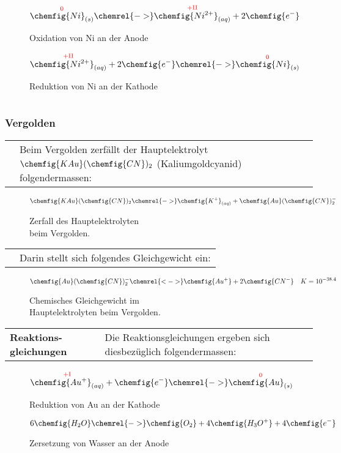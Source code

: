 \begin{figure}[H]\centering
	$$\overset{\mathrm{\color{red}{0}}}{\chemfig{Ni}_{(s)}} \chemrel{->} \overset{\mathrm{\color{red}{+II}}}{\chemfig{Ni^{2+}}_{(aq)}} + 2\chemfig{e^{-}}$$
	\caption{Oxidation von Ni an der Anode}
	$$\overset{\mathrm{\color{red}{+II}}}{\chemfig{Ni^{2+}}_{(aq)}} + 2\chemfig{e^{-}} \chemrel{->} \overset{\mathrm{\color{red}{0}}}{\chemfig{Ni}_{(s)}}$$
	\caption{Reduktion von Ni an der Kathode}
\end{figure}

\begin{longtable}{p{3cm}p{14cm}}
    & \\
    \hline
\end{longtable}

\subsubsection{Vergolden}
\begin{longtable}{p{3cm}p{14cm}}
    & Beim Vergolden zerfällt der Hauptelektrolyt $\chemfig{KAu}(\chemfig{CN})_{2}$ (Kaliumgoldcyanid) folgendermassen:
\end{longtable}

\begin{figure}[H]\centering
    $$\chemfig{KAu}(\chemfig{CN})_{2} \chemrel{->} \chemfig{K^{+}}_{(aq)} + \chemfig{Au}(\chemfig{CN})^{-}_2$$
    \caption{Zerfall des Hauptelektrolyten\\ beim Vergolden.}
\end{figure}


\begin{longtable}{p{3cm}p{14cm}}
    & Darin stellt sich folgendes Gleichgewicht ein:
\end{longtable}

\begin{figure}[H]\centering
    $$\chemfig{Au}(\chemfig{CN})^{-}_2 \chemrel{<->} \chemfig{Au^{+}} + 2\chemfig{CN^{-}} \quad K = 10^{-38.4}$$
    \caption{Chemisches Gleichgewicht im\\ Hauptelektrolyten beim Vergolden.}
\end{figure}

\begin{longtable}{p{3cm}p{14cm}}
    \hline
    \textbf{Reaktions-gleichungen}
    & Die Reaktionsgleichungen ergeben sich diesbezüglich folgendermassen:\\
\end{longtable}

\begin{figure}[H]\centering
    $$\overset{\mathrm{\color{red}{+I}}}{\chemfig{Au^{+}}_{(aq)}} + \chemfig{e^{-}} \chemrel{->} \overset{\mathrm{\color{red}{0}}}{\chemfig{Au}_{(s)}}$$
    \caption{Reduktion von Au an der Kathode}
    $$6\chemfig{H_2O} \chemrel{->} \chemfig{O_2} + 4\chemfig{H_3O^{+}} + 4\chemfig{e^{-}}$$
    \caption{Zersetzung von Wasser an der Anode}
\end{figure}
